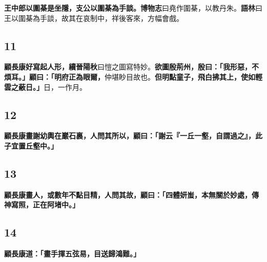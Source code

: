 \textbf{王中郎以圍棊是坐隱，支公以圍棊為手談。}{\footnotesize \textbf{博物志}曰堯作圍棊，以教丹朱。\textbf{語林}曰王以圍棊為手談，故其在哀制中，祥後客來，方幅會戲。}

\subsection*{11}

\textbf{顧長康好寫起人形，}{\footnotesize \textbf{續晉陽秋}曰愷之圖寫特妙。}\textbf{欲圖殷荊州，殷曰：「我形惡，不煩耳。」顧曰：「明府正為眼爾，}{\footnotesize 仲堪眇目故也。}\textbf{但明點童子，飛白拂其上，使如輕雲之蔽日。」}{\footnotesize 日，一作月。}

\subsection*{12}

\textbf{顧長康畫謝幼輿在巖石裏，人問其所以，顧曰：「謝云『一丘一壑，自謂過之』，此子宜置丘壑中。」}

\subsection*{13}

\textbf{顧長康畫人，或數年不點目精，人問其故，顧曰：「四體妍蚩，本無關於妙處，傳神寫照，正在阿堵中。」}

\subsection*{14}

\textbf{顧長康道：「畫手揮五弦易，目送歸鴻難。」}